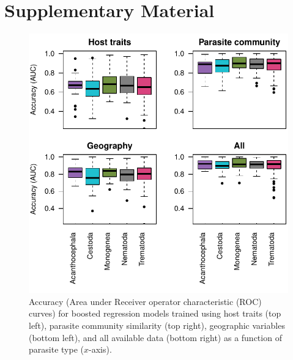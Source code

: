 \documentclass[12pt]{article}
\begin{document}
 
 
 


\newpage
\section{Supplementary Material}

\begin{figure}[h]
  \includegraphics[width=\textwidth]{Figures/parAccuracy.pdf}
  \caption{Accuracy (Area under Receiver operator characteristic (ROC) curves) for boosted regression models trained using host traits (top left), parasite community similarity (top right), geographic variables (bottom left), and all available data (bottom right) as a function of parasite type ($x$-axis).   }
 \label{fig:parasite}
 \end{figure}
\end{document}
